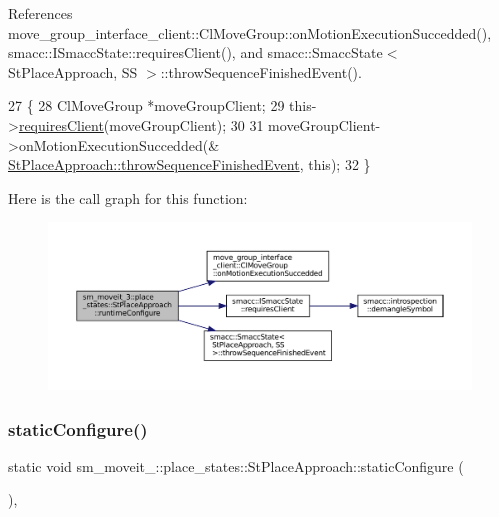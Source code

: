 References move\+\_\+group\+\_\+interface\+\_\+client\+::\+Cl\+Move\+Group\+::on\+Motion\+Execution\+Succedded(), smacc\+::\+I\+Smacc\+State\+::requires\+Client(), and smacc\+::\+Smacc\+State$<$ St\+Place\+Approach, S\+S $>$\+::throw\+Sequence\+Finished\+Event().


\begin{DoxyCode}
27     \{
28         ClMoveGroup *moveGroupClient;
29         this->\hyperlink{classsmacc_1_1ISmaccState_a7f95c9f0a6ea2d6f18d1aec0519de4ac}{requiresClient}(moveGroupClient);
30 
31         moveGroupClient->onMotionExecutionSuccedded(&
      \hyperlink{classsmacc_1_1SmaccState_a49dcfc25824f7e083dd4b999c49ab2b6}{StPlaceApproach::throwSequenceFinishedEvent}, \textcolor{keyword}{this});
32     \}
\end{DoxyCode}
Here is the call graph for this function\+:
\nopagebreak
\begin{figure}[H]
\begin{center}
\leavevmode
\includegraphics[width=350pt]{structsm__moveit__3_1_1place__states_1_1StPlaceApproach_aa0001a28f21038a8bc2f99f3a9c49b62_cgraph}
\end{center}
\end{figure}
\mbox{\label{structsm__moveit__3_1_1place__states_1_1StPlaceApproach_a1d71df8302e7961c652fa3b5a1e08452}} 
\subsubsection{\texorpdfstring{static\+Configure()}{staticConfigure()}}
{\footnotesize\ttfamily static void sm\+\_\+moveit\+\_\+::place\+\_\+states\+::\+St\+Place\+Approach\+::static\+Configure (\begin{DoxyParamCaption}{ }\end{DoxyParamCaption})\hspace{0.3cm}{\ttfamily [inline]}, {\ttfamily [static]}}



